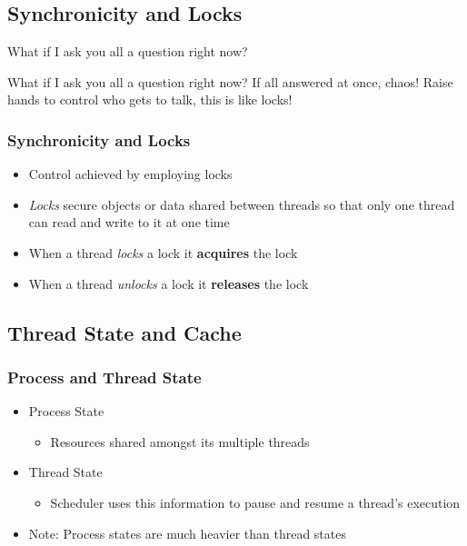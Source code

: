 \documentclass{beamer}
\newcommand{\linespace}{\vskip 0.25cm}
\begin{document}
\subsection[Locks]{Synchronicity and Locks}

\begin{frame}
\begin{center}
What if I ask you all a question right now?
\end{center}
\end{frame}


\begin{frame}
\begin{center}
What if I ask you all a question right now?
\linespace
If all answered at once, chaos!
\linespace
Raise hands to control who gets to talk, this is like locks!
\end{center}
\end{frame}

\begin{frame}
\frametitle{Synchronicity and Locks}

\begin{itemize}
	\item Control achieved by employing locks
	
	\linespace
	
	\item \emph{Locks} secure objects or data shared between threads so that only one thread can read and write to it at one time

	\linespace

	\item When a thread \emph{locks} a lock it \textbf{acquires} the lock
	\item When a thread \emph{unlocks} a lock it \textbf{releases} the lock
\end{itemize}
\end{frame}

\subsection[Cache]{Thread State and Cache}

\begin{frame}
\frametitle{Process and Thread State}
\begin{itemize}
\item Process State

\begin{itemize}
	\item[] Resources shared amongst its multiple threads
\end{itemize}

\item Thread State
\begin{itemize}
	\item[] Scheduler uses this information to pause and resume a thread's execution
\end{itemize}

\linespace

\item Note: Process states are much heavier than thread states
\end{itemize}
\end{frame}
\end{document}
